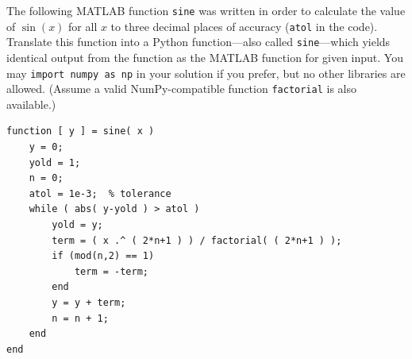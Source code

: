 \documentclass{article}
\begin{document}
The following MATLAB function \texttt{sine} was written in order to calculate the value of $\sin(x)$ for all $x$ to three decimal places of accuracy (\texttt{atol} in the code).  Translate this function into a Python function---also called \texttt{sine}---which yields identical output from the function as the MATLAB function for given input.  You may \texttt{import numpy as np} in your solution if you prefer, but no other libraries are allowed.  (Assume a valid NumPy-compatible function \texttt{factorial} is also available.)

\begin{Verbatim}
function [ y ] = sine( x )
    y = 0;
    yold = 1;
    n = 0;
    atol = 1e-3;  % tolerance
    while ( abs( y-yold ) > atol )
        yold = y;
        term = ( x .^ ( 2*n+1 ) ) / factorial( ( 2*n+1 ) );
        if (mod(n,2) == 1)
            term = -term;
        end
        y = y + term;
        n = n + 1;
    end
end
\end{Verbatim}


\end{document}
